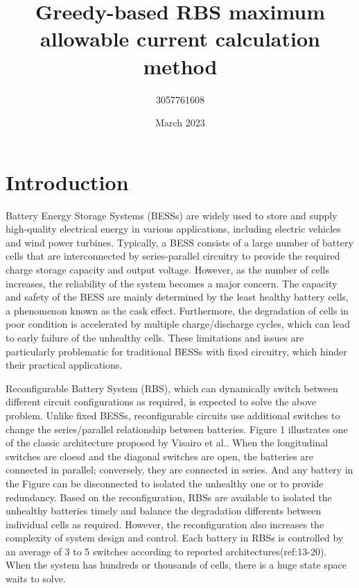 \documentclass{article}
\title{Greedy-based RBS maximum allowable current calculation method}
\author{3057761608 }
\date{March 2023}
\begin{document}
\maketitle

\section{Introduction}

Battery Energy Storage Systems (BESSs) are widely used to store and supply high-quality electrical energy in various applications, including electric vehicles and wind power turbines. 
Typically, a BESS consists of a large number of battery cells that are interconnected by series-parallel circuitry to provide the required charge storage capacity and output voltage. 
However, as the number of cells increases, the reliability of the system becomes a major concern. 
The capacity and safety of the BESS are mainly determined by the least healthy battery cells, a phenomenon known as the cask effect. 
Furthermore, the degradation of cells in poor condition is accelerated by multiple charge/discharge cycles, which can lead to early failure of the unhealthy cells. 
These limitations and issues are particularly problematic for traditional BESSs with fixed circuitry, which hinder their practical applications. 


Reconfigurable Battery System (RBS), which can dynamically  switch between different circuit configurations as required, is expected to solve the above problem. 
Unlike fixed BESSs, reconfigurable circuits use additional switches to change the series/parallel relationship between batteries.
Figure 1 illustrates one of the classic architecture proposed by Visairo et al.\cite{visairoReconfigurableBatteryPack2008}.
When the longitudinal switches are cloesd and the diagonal switches are open, the batteries are connected in parallel; conversely, they are connected in series.
And any battery in the Figure can be disconnected to isolated the unhealthy one or to provide redundancy.
Based on the reconfiguration, RBSs are available to isolated the unhealthy batteries timely and balance the degradation differents between individual cells as required.
However, the reconfiguration also increases the complexity of system design and control.
Each battery in RBSs is controlled by an average of 3 to 5 switches according to reported architectures(ref:13-20).
When the system has hundreds or thousands of cells, there is a huge state space waits to solve.
\end{document}
